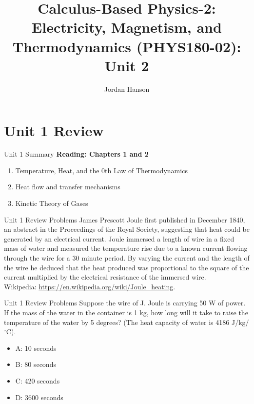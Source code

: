 \documentclass{beamer}
\title{Calculus-Based Physics-2: Electricity, Magnetism, and Thermodynamics (PHYS180-02): Unit 2}
\author{Jordan Hanson}
\institute{Whittier College Department of Physics and Astronomy}
\begin{document}
\maketitle

\section{Unit 1 Review}

\begin{frame}{Unit 1 Summary}
\textbf{Reading: Chapters 1 and 2}
\begin{enumerate}
\item Temperature, Heat, and the 0th Law of Thermodynamics
\item Heat flow and transfer mechanisms
\item Kinetic Theory of Gases
\end{enumerate}
\end{frame}

\begin{frame}{Unit 1 Review Problems}
\small
James Prescott Joule first published in December 1840, an abstract in the Proceedings of the Royal Society, suggesting that heat could be generated by an electrical current. Joule immersed a length of wire in a fixed mass of water and measured the temperature rise due to a known current flowing through the wire for a 30 minute period. By varying the current and the length of the wire he deduced that the heat produced was proportional to the square of the current multiplied by the electrical resistance of the immersed wire. \\ \vspace{0.5cm} Wikipedia: \url{https://en.wikipedia.org/wiki/Joule_heating}.
\end{frame}

\begin{frame}{Unit 1 Review Problems}
Suppose the wire of J. Joule is carrying 50 W of power.  If the mass of the water in the container is 1 kg, how long will it take to raise the temperature of the water by 5 degrees?  (The heat capacity of water is 4186 J/kg/$^{\circ}$C).
\begin{itemize}
\item A: 10 seconds
\item B: 80 seconds
\item C: 420 seconds
\item D: 3600 seconds
\end{itemize}
\end{frame}
\end{document}
